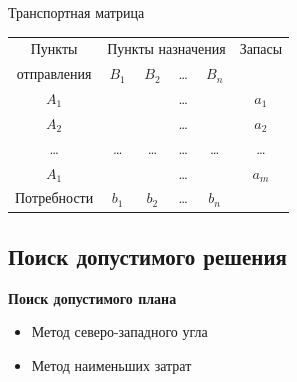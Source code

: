 \documentclass[unicode,11pt,notheorems,xcolor=table]{beamer}
\begin{document}
\begin{frame}{Транспортная матрица}{}
	\begin{tabular}{|c|c|c|c|c|c|}
		\hline
		Пункты & \multicolumn{4}{c|}{Пункты назначения} & Запасы\\
		\cline{2-5}
		отправления & $B_1$ &$B_2$ & \ldots & $B_n$ & \\
		\hline
		$A_1$& \diagbox{$x_{11}$}{$c_{11}$} &\diagbox{$x_{12}$}{$c_{12}$} & \ldots & \diagbox{$x_{1n}$}{$c_{1n}$} & $a_1$ \\
		\hline
		$A_2$& \diagbox{$x_{21}$}{$c_{21}$} &\diagbox{$x_{22}$}{$c_{22}$} & \ldots & \diagbox{$x_{2n}$}{$c_{2n}$} & $a_2$ \\
		\hline
		\ldots & \ldots & \ldots & \ldots & \ldots & \ldots \\
		\hline
		$A_1$& \diagbox{$x_{11}$}{$c_{11}$} &\diagbox{$x_{12}$}{$c_{12}$} & \ldots & \diagbox{$x_{1n}$}{$c_{1n}$} & $a_m$ \\
		\hline
		Потребности & $b_{1}$ &$b_{2}$ & \ldots & $b_{n}$ &  \\
		\hline
	\end{tabular}
\end{frame}

\subsection{Поиск допустимого решения}

\begin{frame}{}{}
	{\centering
		\LARGE
		\bfseries
		Поиск допустимого плана
		\bigskip
		\par}
	\begin{itemize}
		\item 
		Метод северо-западного угла
		\item 
		Метод наименьших затрат
	\end{itemize}
\end{frame}
\end{document}
